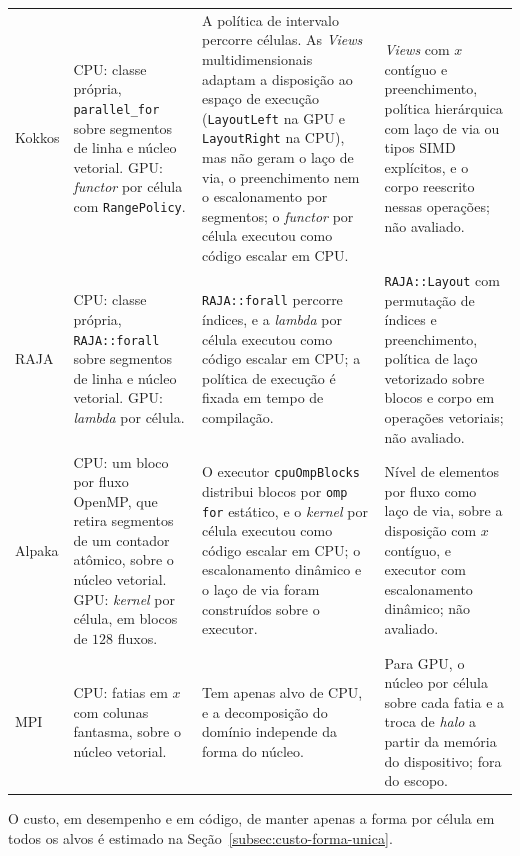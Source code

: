 {\begin{longtable}{>{\raggedright\arraybackslash}p{1.6cm}>{\raggedright\arraybackslash}p{3.0cm}>{\raggedright\arraybackslash}p{4.6cm}>{\raggedright\arraybackslash}p{4.4cm}}
    Kokkos &
        CPU: classe própria, \texttt{parallel\_for} sobre segmentos de linha e núcleo vetorial. GPU: \textit{functor} por célula com \texttt{RangePolicy}. &
        A política de intervalo percorre células. As \textit{Views} multidimensionais adaptam a disposição ao espaço de execução (\texttt{LayoutLeft} na GPU e \texttt{LayoutRight} na CPU), mas não geram o laço de via, o preenchimento nem o escalonamento por segmentos; o \textit{functor} por célula executou como código escalar em CPU. &
        \textit{Views} com $x$ contíguo e preenchimento, política hierárquica com laço de via ou tipos SIMD explícitos, e o corpo reescrito nessas operações; não avaliado. \\
    RAJA &
        CPU: classe própria, \texttt{RAJA::forall} sobre segmentos de linha e núcleo vetorial. GPU: \textit{lambda} por célula. &
        \texttt{RAJA::forall} percorre índices, e a \textit{lambda} por célula executou como código escalar em CPU; a política de execução é fixada em tempo de compilação. &
        \texttt{RAJA::Layout} com permutação de índices e preenchimento, política de laço vetorizado sobre blocos e corpo em operações vetoriais; não avaliado. \\
    Alpaka &
        CPU: um bloco por fluxo OpenMP, que retira segmentos de um contador atômico, sobre o núcleo vetorial. GPU: \textit{kernel} por célula, em blocos de $128$ fluxos. &
        O executor \texttt{cpuOmpBlocks} distribui blocos por \texttt{omp for} estático, e o \textit{kernel} por célula executou como código escalar em CPU; o escalonamento dinâmico e o laço de via foram construídos sobre o executor. &
        Nível de elementos por fluxo como laço de via, sobre a disposição com $x$ contíguo, e executor com escalonamento dinâmico; não avaliado. \\
    MPI &
        CPU: fatias em $x$ com colunas fantasma, sobre o núcleo vetorial. &
        Tem apenas alvo de CPU, e a decomposição do domínio independe da forma do núcleo. &
        Para GPU, o núcleo por célula sobre cada fatia e a troca de \textit{halo} a partir da memória do dispositivo; fora do escopo. \\
\end{longtable}
}

O custo, em desempenho e em código, de manter apenas a forma por célula em todos os alvos é estimado na Seção~\ref{subsec:custo-forma-unica}.


